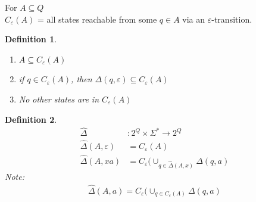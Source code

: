 \documentclass[a4paper]{article}
\newtheorem{definition}{Definition}
\begin{document}
        For $A\subseteq Q$\\
        $C_\varepsilon(A)$ = all states reachable from some $q\in A$ via an
        $\varepsilon$-transition.
        \begin{definition}
            \begin{enumerate}
                \item $A\subseteq C_\varepsilon(A)$
                \item if $q\in C_\varepsilon(A)$, then $\Delta(q,\varepsilon)
                    \subseteq C_\varepsilon(A)$
                \item No other states are in $C_\varepsilon(A)$
            \end{enumerate}
        \end{definition}
        \begin{definition}
            \begin{align*}
            \hat{\Delta}&: 2^Q\times \Sigma^* \rightarrow 2^Q\\
            \hat{\Delta}(A,\varepsilon)&=C_\varepsilon(A)\\
            \hat{\Delta}(A,xa)&=C_\varepsilon(\cup_{q\in\hat{\Delta}(A,x)}\Delta
            (q,a)
        \end{align*}
        Note:
        \begin{align*}
            \hat{\Delta}(A,a)=C_\varepsilon(\cup_{q\in C_\varepsilon(A)}\Delta(q,a)
        \end{align*}
        \end{definition}
\end{document}
